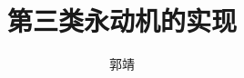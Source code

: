 \documentclass[doctor]{hnuthesis}
\title{第三类永动机的实现}
\author{郭靖}
\begin{document}
\maketitle


\tableofcontents
\begingroup
    \renewcommand*{\addvspace}[1]{}
        \listoffigures
        \newpage

        \listoftables
        \newpage
\endgroup

\mainmatter





\appendix



\backmatter

\end{document}
